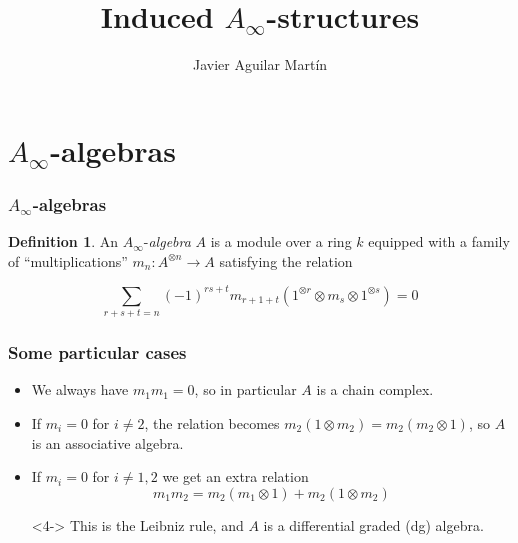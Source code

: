 \documentclass{beamer}
\title{Induced $A_\infty$-structures}
\author{Javier Aguilar Mart\'in}
\institute{University of Kent}
\date{}
\theoremstyle{definition}
\newtheorem{defi}{Definition}
\begin{document}
\frame{\titlepage}
%
% 
% 
% 

% 



\newcommand{\seti}{\setcounter{saveenumi}{\value{enumi}}}
\newcommand{\conti}{\setcounter{enumi}{\value{saveenumi}}}

\makeatletter
\makeatother

\section{$A_\infty$-algebras}
\begin{frame}
\frametitle{$A_\infty$-algebras}
\begin{defi}
An $A_\infty$-\emph{algebra} $A$ is a module over a ring $k$ equipped with a family of ``multiplications'' $m_n:A^{\otimes n}\to A$ satisfying the relation

$$\sum_{r+s+t=n}(-1)^{rs+t}m_{r+1+t}(1^{\otimes r}\otimes m_s\otimes 1^{\otimes s})=0$$ %
\end{defi}
\end{frame}





\begin{frame}
\frametitle{Some particular cases}
\begin{itemize}
\item<1-> We always have $m_1m_1=0$, so in particular $A$ is a chain complex.
\item<2-> If $m_i=0$ for $i\neq 2$, the relation becomes $m_2(1\otimes m_2)=m_2(m_2\otimes 1)$, so $A$ is an associative algebra.
\item<3-> If $m_i=0$ for $i\neq 1,2$ we get an extra relation $$m_1m_2=m_2(m_1\otimes 1)+m_2(1\otimes m_2)$$ 
\item[]<4-> This is the Leibniz rule, and $A$ is a differential graded (dg) algebra.
\end{itemize}
\end{frame}
\end{document}
